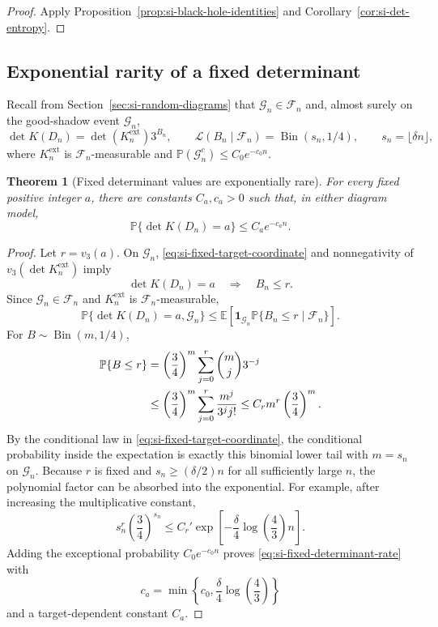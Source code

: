 \documentclass[9pt,twoside]{pnas-new}
\newtheorem{theorem}{Theorem}
\theoremstyle{definition}
\theoremstyle{remark}
\renewcommand{\Pr}{\mathbb{P}}
\begin{document}
\begin{proof}
Apply Proposition~\ref{prop:si-black-hole-identities} and Corollary~\ref{cor:si-det-entropy}.
\end{proof}

\subsection{Exponential rarity of a fixed determinant}
Recall from Section~\ref{sec:si-random-diagrams} that $\mathcal G_n\in\mathcal F_n$ and, almost surely on the good-shadow event $\mathcal G_n$,
\begin{equation}
 \det K(D_n)=\det(K_n^{\mathrm{ext}})3^{B_n},
 \qquad
 \mathcal L(B_n\mid\mathcal F_n)=\operatorname{Bin}(s_n,1/4),
 \qquad
 s_n=\lfloor\delta n\rfloor,
 \label{eq:si-fixed-target-coordinate}
\end{equation}
where $K_n^{\mathrm{ext}}$ is $\mathcal F_n$-measurable and $\Pr(\mathcal G_n^c)\le C_0e^{-c_0n}$.

\begin{theorem}[Fixed determinant values are exponentially rare]
\label{thm:si-fixed-determinant}
For every fixed positive integer $a$, there are constants $C_a,c_a>0$ such that, in either diagram model,
\begin{equation}
 \Pr\{\det K(D_n)=a\}\le C_ae^{-c_an}.
 \label{eq:si-fixed-determinant-rate}
\end{equation}
\end{theorem}

\begin{proof}
Let $r=v_3(a)$.  On $\mathcal G_n$, \eqref{eq:si-fixed-target-coordinate} and nonnegativity of $v_3(\det K_n^{\mathrm{ext}})$ imply
\[
 \det K(D_n)=a
 \quad\Longrightarrow\quad
 B_n\le r.
\]
Since $\mathcal G_n\in\mathcal F_n$ and $K_n^{\mathrm{ext}}$ is $\mathcal F_n$-measurable,
\[
 \Pr\{\det K(D_n)=a,\mathcal G_n\}
 \le
 \mathbb E\!\left[\mathbf 1_{\mathcal G_n}\Pr\{B_n\le r\mid\mathcal F_n\}\right].
\]
For $B\sim\operatorname{Bin}(m,1/4)$,
\begin{align}
 \Pr\{B\le r\}
 &=\left(\frac34\right)^m
   \sum_{j=0}^{r}\binom mj3^{-j}\notag\\
 &\le
 \left(\frac34\right)^m
 \sum_{j=0}^{r}\frac{m^j}{3^jj!}
 \le C_r m^r\left(\frac34\right)^m.
 \label{eq:si-fixed-binomial-tail}
\end{align}
By the conditional law in \eqref{eq:si-fixed-target-coordinate}, the conditional probability inside the expectation is exactly this binomial lower tail with $m=s_n$ on $\mathcal G_n$. Because $r$ is fixed and $s_n\ge(\delta/2)n$ for all sufficiently large $n$, the polynomial factor can be absorbed into the exponential.  For example, after increasing the multiplicative constant,
\[
 s_n^r\left(\frac34\right)^{s_n}
 \le
 C_r'\exp\!\left[-\frac{\delta}{4}\log\!\left(\frac43\right)n\right].
\]
Adding the exceptional probability $C_0e^{-c_0n}$ proves \eqref{eq:si-fixed-determinant-rate} with
\[
 c_a=\min\!\left\{c_0,\frac{\delta}{4}\log\!\left(\frac43\right)\right\}
\]
and a target-dependent constant $C_a$.
\end{proof}
\end{document}
